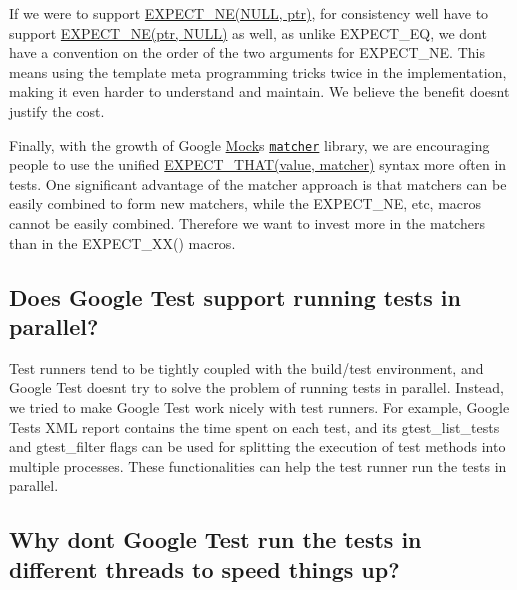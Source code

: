 If we were to support {\ttfamily \hyperlink{gtest_8h_a6ae7443947f25abc58bfcfcfc56b0d75}{E\+X\+P\+E\+C\+T\+\_\+\+N\+E(\+N\+U\+L\+L, ptr)}}, for consistency we\textquotesingle{}ll have to support {\ttfamily \hyperlink{gtest_8h_a6ae7443947f25abc58bfcfcfc56b0d75}{E\+X\+P\+E\+C\+T\+\_\+\+N\+E(ptr, N\+U\+L\+L)}} as well, as unlike {\ttfamily E\+X\+P\+E\+C\+T\+\_\+\+EQ}, we don\textquotesingle{}t have a convention on the order of the two arguments for {\ttfamily E\+X\+P\+E\+C\+T\+\_\+\+NE}. This means using the template meta programming tricks twice in the implementation, making it even harder to understand and maintain. We believe the benefit doesn\textquotesingle{}t justify the cost.

Finally, with the growth of Google \hyperlink{classMock}{Mock}\textquotesingle{}s \href{../../CookBook.md#using-matchers-in-google-test-assertions}{\tt matcher} library, we are encouraging people to use the unified {\ttfamily \hyperlink{gmock-matchers_8h_ac31e206123aa702e1152bb2735b31409}{E\+X\+P\+E\+C\+T\+\_\+\+T\+H\+A\+T(value, matcher)}} syntax more often in tests. One significant advantage of the matcher approach is that matchers can be easily combined to form new matchers, while the {\ttfamily E\+X\+P\+E\+C\+T\+\_\+\+NE}, etc, macros cannot be easily combined. Therefore we want to invest more in the matchers than in the {\ttfamily E\+X\+P\+E\+C\+T\+\_\+\+X\+X()} macros.

\subsection*{Does Google Test support running tests in parallel?}

Test runners tend to be tightly coupled with the build/test environment, and Google Test doesn\textquotesingle{}t try to solve the problem of running tests in parallel. Instead, we tried to make Google Test work nicely with test runners. For example, Google Test\textquotesingle{}s X\+ML report contains the time spent on each test, and its {\ttfamily gtest\+\_\+list\+\_\+tests} and {\ttfamily gtest\+\_\+filter} flags can be used for splitting the execution of test methods into multiple processes. These functionalities can help the test runner run the tests in parallel.

\subsection*{Why don\textquotesingle{}t Google Test run the tests in different threads to speed things up?}

